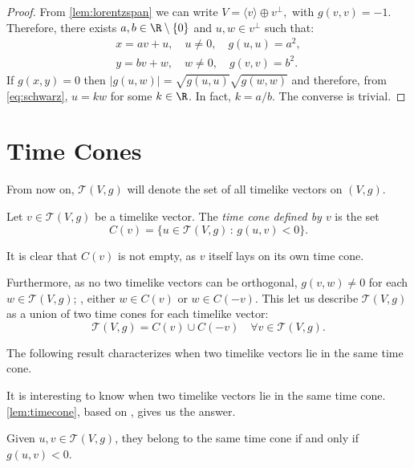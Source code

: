\begin{proof}
    From \autoref{lem:lorentzspan} we can write $V=\langle v \rangle \oplus v^{\perp},$ with $g(v,v)=-1$. Therefore, there exists $a,b \in \R\setminus\{0\}$ and $u,w \in v^\perp$ such that:
    \begin{align*}
        x=av+u, \quad u\neq 0, \quad g(u,u)=a^2,\\
        y=bv+w, \quad w\neq 0, \quad g(v,v)=b^2.
    \end{align*}
    If $g(x,y)=0$ then $\lvert g(u,w) \rvert = \sqrt{g(u,u)}\sqrt{g(w,w)}$ and therefore, from \autoref{eq:schwarz}, $u=kw$ for some $k\in \R$. In fact, $k=a/b$. The converse is trivial.
\end{proof}

\section{Time Cones}

From now on, $\mathcal{T}(V,g)$ will denote the set of all timelike vectors on $(V,g)$.

\begin{definition}
	Let $v\in \mathcal{T}(V,g)$ be a timelike vector. The \emph{time cone defined by $v$} is the set
	\[
	C(v)=\{u\in\mathcal{T}(V,g)\, : \, g(u,v)<0 \}.
	\]
\end{definition}

It is clear that $C(v)$ is not empty, as $v$ itself lays on its own time cone.

Furthermore, as no two timelike vectors can be orthogonal, $g(v,w) \neq 0$ for each $w \in \mathcal{T}(V,g)$; \ie, either $w\in C(v)$ or $w\in C(-v)$. This let us describe $\mathcal{T}(V,g)$ as a union of two time cones for each timelike vector:
\[
\mathcal{T}(V,g) = C(v) \cup C(-v) \quad \forall v\in \mathcal{T}(V,g).
\]

The following result characterizes when two timelike vectors lie in the same time cone.

It is interesting to know when two timelike vectors lie in the same time cone. \autoref{lem:timecone}, based on \cite[Lemma 5.29]{oneill83}, gives us the answer.

\begin{lemma}\label{lem:timecone}
Given $u,v\in \mathcal{T}(V,g)$, they belong to the same time cone if and only if $g(u,v)<0$.
\end{lemma}

